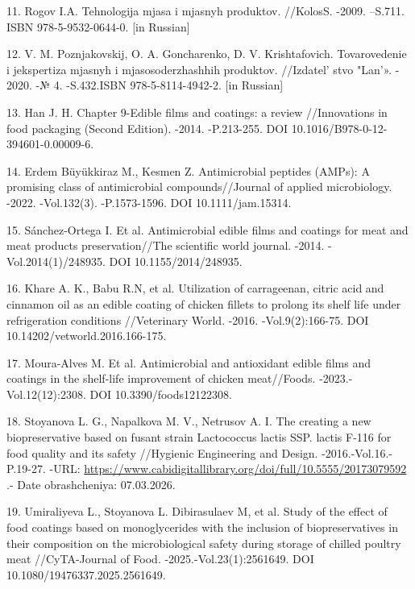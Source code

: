 \begin{refs}
11. Rogov I.A. Tehnologija mjasa i mjasnyh produktov. //KolosS. -2009.
--S.711. ISBN 978-5-9532-0644-0. {[}in Russian{]}

12. V. M. Poznjakovskij, O. A. Goncharenko, D. V. Krishtafovich.
Tovarovedenie i jekspertiza mjasnyh i mjasosoderzhashhih produktov.
//Izdatel' stvo "Lan'». - 2020. -№ 4.
-S.432.ISBN 978-5-8114-4942-2. {[}in Russian{]}

13. Han J. H. Chapter 9-Edible films and coatings: a review //Innovations
in food packaging (Second Edition). -2014. -P.213-255. DOI
10.1016/B978-0-12-394601-0.00009-6.

14. Erdem Büyükkiraz M., Kesmen Z. Antimicrobial peptides (AMPs): A
promising class of antimicrobial compounds//Journal of applied
microbiology. -2022. -Vol.132(3). -P.1573-1596. DOI 10.1111/jam.15314.

15. Sánchez-Ortega I. Et al. Antimicrobial edible films and coatings for
meat and meat products preservation//The scientific world journal.
-2014. -Vol.2014(1)/248935. DOI 10.1155/2014/248935.

16. Khare A. K., Babu R.N, et al. Utilization of carrageenan, citric acid
and cinnamon oil as an edible coating of chicken fillets to prolong its
shelf life under refrigeration conditions //Veterinary World. -2016.
-Vol.9(2):166-75. DOI 10.14202/vetworld.2016.166-175.

17. Moura-Alves M. Et al. Antimicrobial and antioxidant edible films and
coatings in the shelf-life improvement of chicken meat//Foods.
-2023.-Vol.12(12):2308. DOI 10.3390/foods12122308.

18. Stoyanova L. G., Napalkova M. V., Netrusov A. I. The creating a new
biopreservative based on fusant strain Lactococcus lactis SSP. lactis
F-116 for food quality and its safety //Hygienic Engineering and Design.
-2016.-Vol.16.-P.19-27. -URL:
\url{https://www.cabidigitallibrary.org/doi/full/10.5555/20173079592} .-
Date obrashcheniya: 07.03.2026.

19. Umiraliyeva L., Stoyanova L. Dibirasulaev M, et al. Study of the
effect of food coatings based on monoglycerides with the inclusion of
biopreservatives in their composition on the microbiological safety
during storage of chilled poultry meat //CyTA-Journal of Food.
-2025.-Vol.23(1):2561649. DOI 10.1080/19476337.2025.2561649.
\end{refs}

